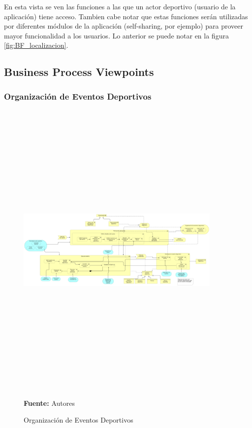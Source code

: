 En esta vista se ven las funciones a las que un actor deportivo (usuario de la aplicación) tiene acceso. Tambien cabe notar que estas funciones serán utilizadas por diferentes módulos de la aplicación (self-sharing, por ejemplo) para proveer mayor funcionalidad a los usuarios. Lo anterior se puede notar en la figura \ref{fig:BF_localizacion}.

\subsection{Business Process Viewpoints}

\subsubsection{Organización de Eventos Deportivos}

\begin{figure}[!htb]
  \begin{center}
    \includegraphics[angle=90,width=10cm,height=15cm]{./imagenes/Archimate/vistas/business_process/organizacioneventosdeportivos.png}
    \caption{Organización de Eventos Deportivos}
    \label{fig:bp_organizacion_eventos_deportivos}
    \textbf{Fuente:}  Autores \\
  \end{center}
\end{figure}

